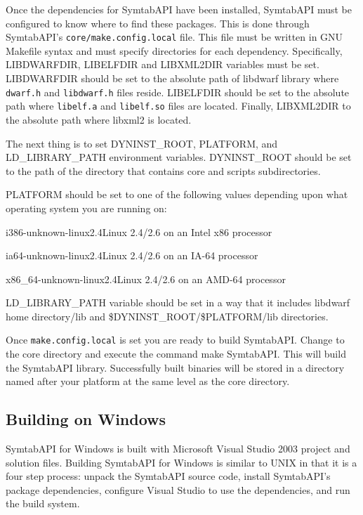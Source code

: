 Once the dependencies for SymtabAPI have been installed, SymtabAPI must be
configured to know where to find these packages. This is done through
SymtabAPI's \texttt{core/make.config.local} file. This file must be written in
GNU Makefile syntax and must specify directories for each dependency.
Specifically, LIBDWARFDIR, LIBELFDIR and LIBXML2DIR variables must be set.
LIBDWARFDIR should be set to the absolute path of libdwarf library where
\texttt{dwarf.h} and \texttt{libdwarf.h} files reside. LIBELFDIR should be set
to the absolute path where \texttt{libelf.a} and \texttt{libelf.so} files are
located. Finally, LIBXML2DIR to the absolute path where libxml2 is located.

The next thing is to set DYNINST\_ROOT, PLATFORM, and LD\_LIBRARY\_PATH
environment variables. DYNINST\_ROOT should be set to the path of the directory
that contains core and scripts subdirectories.

PLATFORM should be set to one of the following values depending upon what operating system you are running on:
\begin{description}
    \item i386-unknown-linux2.4Linux 2.4/2.6 on an Intel x86 processor
    \item ia64-unknown-linux2.4Linux 2.4/2.6 on an IA-64 processor
    \item x86\_64-unknown-linux2.4Linux 2.4/2.6 on an AMD-64 processor
\end{description}

LD\_LIBRARY\_PATH variable should be set in a way that it includes libdwarf home
directory/lib and \${DYNINST\_ROOT}/\${PLATFORM}/lib directories.

Once \texttt{make.config.local} is set you are ready to build SymtabAPI. Change
to the core directory and execute the command make SymtabAPI. This will build
the SymtabAPI library. Successfully built binaries will be stored in a directory
named after your platform at the same level as the core directory. 

\subsection{Building on Windows}

SymtabAPI for Windows is built with Microsoft Visual Studio 2003 project and
solution files.   Building SymtabAPI for Windows is similar to UNIX in that it
is a four step process: unpack the SymtabAPI source code, install SymtabAPI's
package dependencies, configure Visual Studio to use the dependencies, and run
the build system. 

